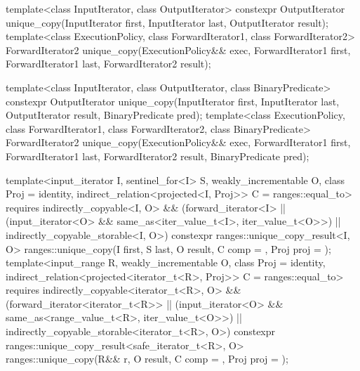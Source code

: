 %
\begin{itemdecl}
template<class InputIterator, class OutputIterator>
  constexpr OutputIterator
    unique_copy(InputIterator first, InputIterator last,
                OutputIterator result);
template<class ExecutionPolicy, class ForwardIterator1, class ForwardIterator2>
  ForwardIterator2
    unique_copy(ExecutionPolicy&& exec,
                ForwardIterator1 first, ForwardIterator1 last,
                ForwardIterator2 result);

template<class InputIterator, class OutputIterator,
         class BinaryPredicate>
  constexpr OutputIterator
    unique_copy(InputIterator first, InputIterator last,
                OutputIterator result, BinaryPredicate pred);
template<class ExecutionPolicy, class ForwardIterator1, class ForwardIterator2,
         class BinaryPredicate>
  ForwardIterator2
    unique_copy(ExecutionPolicy&& exec,
                ForwardIterator1 first, ForwardIterator1 last,
                ForwardIterator2 result, BinaryPredicate pred);

template<input_iterator I, sentinel_for<I> S, weakly_incrementable O,
         class Proj = identity, indirect_relation<projected<I, Proj>> C = ranges::equal_to>
  requires indirectly_copyable<I, O> &&
           (forward_iterator<I> ||
            (input_iterator<O> && same_as<iter_value_t<I>, iter_value_t<O>>) ||
            indirectly_copyable_storable<I, O>)
  constexpr ranges::unique_copy_result<I, O>
    ranges::unique_copy(I first, S last, O result, C comp = {}, Proj proj = {});
template<input_range R, weakly_incrementable O, class Proj = identity,
         indirect_relation<projected<iterator_t<R>, Proj>> C = ranges::equal_to>
  requires indirectly_copyable<iterator_t<R>, O> &&
           (forward_iterator<iterator_t<R>> ||
            (input_iterator<O> && same_as<range_value_t<R>, iter_value_t<O>>) ||
            indirectly_copyable_storable<iterator_t<R>, O>)
  constexpr ranges::unique_copy_result<safe_iterator_t<R>, O>
    ranges::unique_copy(R&& r, O result, C comp = {}, Proj proj = {});
\end{itemdecl}

